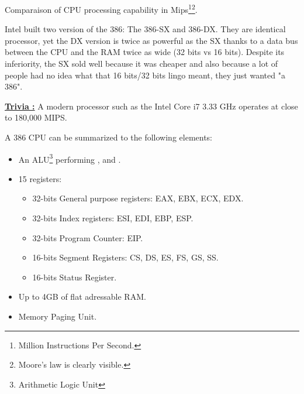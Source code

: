 \documentclass[book.tex]{subfiles}
\begin{document}
\begin{figure}[H]
\centering
 \end{figure}
 \par
 Comparaison of CPU processing capability in Mips\footnote{Million Instructions Per Second.}\footnote{ Moore's law is clearly visible.}.\\
 \par
 Intel built two version of the 386: The 386-SX and 386-DX. They are identical processor, yet the DX version is twice as powerful as the SX thanks to a data bus between the CPU and the RAM twice as wide (32 bits vs 16 bits). Despite its inferiority, the SX sold well because it was cheaper and also because a lot of people had no idea what that 16 bits/32 bits lingo meant, they just wanted "a 386".\\
 \par
 \textbf{\underline{Trivia :}} A modern processor such as the Intel Core i7 3.33 GHz operates at close to 180,000 MIPS.\\
\par

A 386 CPU can be summarized to the following elements:
\begin{itemize}
\item An ALU\footnote{Arithmetic Logic Unit} performing ,  and .
\item 15 registers:
\begin{itemize}
  \item 32-bits General purpose registers: EAX, EBX, ECX, EDX.
  \item 32-bits Index registers: ESI, EDI, EBP, ESP.
  \item 32-bits Program Counter: EIP.
  \item 16-bits Segment Registers: CS, DS, ES, FS, GS, SS.
  \item 16-bits Status Register.
\end{itemize}
\item Up to 4GB of flat adressable RAM.
\item Memory Paging Unit.
\end{itemize}
\end{document}
